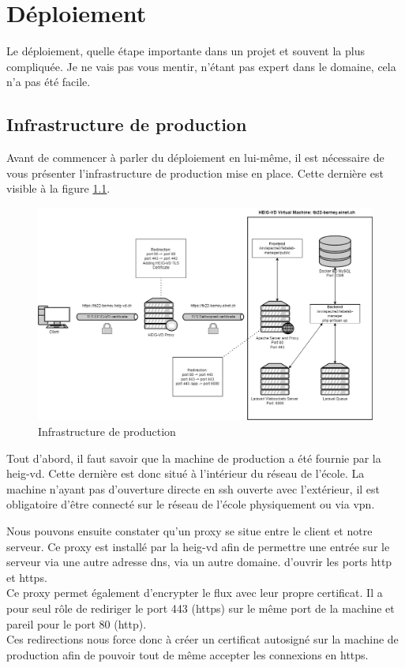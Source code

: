 \documentclass[
    iai, %
    il, %
]{heig-tb}
\begin{document}
\chapter{Déploiement}
Le déploiement, quelle étape importante dans un projet et souvent la plus compliquée.
Je ne vais pas vous mentir, n'étant pas expert dans le domaine, cela n'a pas été facile.

\section{Infrastructure de production}
Avant de commencer à parler du déploiement en lui-même, il est nécessaire de vous présenter l'infrastructure de production mise en place. Cette dernière est visible à la figure \ref{prod-infra}.

\begin{center}
    \begin{figure}
        \includegraphics[width=\textwidth]{./assets/figures/prod-infra.png}
        \caption{Infrastructure de production \label{prod-infra}}
    \end{figure}
\end{center}

Tout d'abord, il faut savoir que la machine de production a été fournie par la \Gls{heig-vd}. Cette dernière est donc situé à l'intérieur du réseau de l'école. La machine n'ayant pas d'ouverture directe en \Gls{ssh} ouverte avec l'extérieur, il est obligatoire d'être connecté sur le réseau de l'école physiquement ou via \Gls{vpn}.

Nous pouvons ensuite constater qu'un \Gls{proxy} se situe entre le client et notre serveur. Ce \Gls{proxy} est installé par la \Gls{heig-vd} afin de permettre une entrée sur le serveur via une autre adresse \Gls{dns}, via un autre domaine. d'ouvrir les ports \Gls{http} et \Gls{https}. \\
Ce \Gls{proxy} permet également d'encrypter le flux avec leur propre certificat. Il a pour seul rôle de rediriger le port 443 (\Gls{https}) sur le même port de la machine et pareil pour le port 80 (\Gls{http}). \\
Ces redirections nous force donc à créer un certificat autosigné sur la machine de production afin de pouvoir tout de même accepter les connexions en \Gls{https}.
\end{document}
